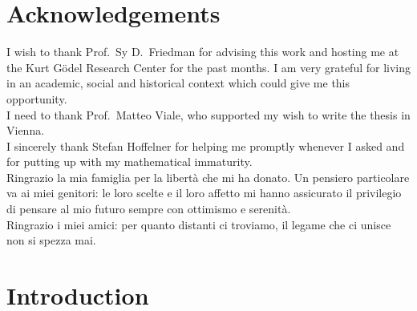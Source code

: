 \documentclass[11pt,a4paper]{report}
\theoremstyle{definition}
\theoremstyle{num.custom-title}
\theoremstyle{custom-title}
\begin{document}
\newpage\null\thispagestyle{empty}\newpage


\chapter*{Acknowledgements}

\thispagestyle{empty}

I wish to thank Prof.\ Sy D.\ Friedman for advising this work and hosting me at the Kurt Gödel Research Center for the past months. I am very grateful for living in an academic, social and historical context which could give me this opportunity.\\

I need to thank Prof.\ Matteo Viale, who supported my wish to write the thesis in Vienna.\\

I sincerely thank Stefan Hoffelner for helping me promptly whenever I asked and for putting up with my mathematical immaturity.\\

Ringrazio la mia famiglia per la libertà che mi ha donato. Un pensiero particolare va ai miei genitori: le loro scelte e il loro affetto mi hanno assicurato il privilegio di pensare al mio futuro sempre con ottimismo e serenità.\\

Ringrazio i miei amici: per quanto distanti ci troviamo, il legame che ci unisce non si spezza mai.
%
%
%


\newpage\null\thispagestyle{empty}\newpage


\tableofcontents


\newpage\null\thispagestyle{empty}\newpage


\chapter*{Introduction}
\end{document}
